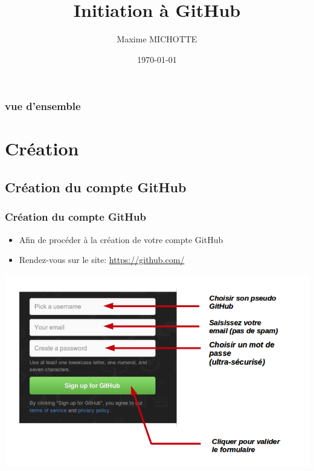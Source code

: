 \documentclass{beamer}
\title[Initiation GitHub]{Initiation \`{a} GitHub}
\author{Maxime MICHOTTE}
\institute[Universit\'{e} de Rouen]
{
Universit\'{e} de Rouen \\
\medskip
\textit{}
}
\date{\today}
\begin{document}
\begin{frame}
\titlepage
\end{frame}

\begin{frame}
\frametitle{vue d'ensemble}
\tableofcontents
\end{frame}

\section{Cr\'eation}
\subsection{Cr\'eation du compte GitHub}
\begin{frame}
\frametitle{Cr\'eation du compte GitHub}
\begin{itemize}
\item Afin de proc\'{e}der \`{a} la cr\'{e}ation de votre compte GitHub
\item Rendez-vous sur le site: \href{https://github.com/}{https://github.com/}
\end{itemize}
\includegraphics[scale=0.3]{git_hub_home1.png}
\end{frame}
\end{document}
